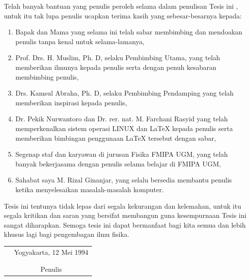 \documentclass[tesis]{ugmtesis}
\begin{document}
Telah banyak bantuan yang penulis peroleh selama dalam penulisan Tesis ini
, untuk itu tak lupa penulis ucapkan terima kasih yang sebesar-besarnya
kepada:
\begin{enumerate}
\item{Bapak dan Mama yang selama ini telah sabar membimbing dan mendoakan
penulis tanpa kenal untuk selama-lamanya,}
\item{Prof. Drs. H. Muslim, Ph. D, selaku Pembimbing Utama, yang telah
memberikan ilmunya kepada penulis serta dengan penuh kesabaran membimbing penulis,}
\item{Drs. Kamsul Abraha, Ph. D, selaku Pembimbing Pendamping yang telah
memberikan inspirasi kepada penulis,} 
\item{Dr. Pekik Nurwantoro dan Dr. rer. nat. M. Farchani Rasyid
yang telah memperkenalkan sistem operasi LINUX dan \LaTeX{} kepada penulis serta
memberikan bimbingan penggunaan \LaTeX{} tersebut dengan sabar,} 
\item{Segenap staf dan karyawan di jurusan Fisika FMIPA UGM, yang telah
banyak bekerjasama dengan penulis selama belajar di FMIPA UGM,} 
\item{Sahabat saya M. Rizal Ginanjar, yang selalu bersedia membantu penulis ketika
menyelesaikan masalah-masalah komputer.} 
\end{enumerate}

Tesis ini tentunya tidak lepas dari segala kekurangan dan kelemahan, untuk itu
segala kritikan dan saran yang bersifat membangun guna kesempurnaan Tesis ini
sangat diharapkan. Semoga tesis ini dapat bermanfaat bagi kita semua dan lebih
khusus lagi bagi pengembagan ilmu fisika.

\begin{tabular}{p{7.5cm}c}
&Yogyakarta, 12 Mei 1994\\
&\\
&\\
&Penulis
\end{tabular}

\tableofcontents
\listoftables
\listoffigures
\end{document}
